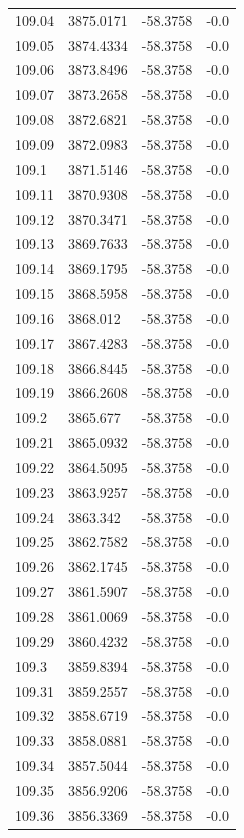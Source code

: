 \begin{table}[H]
\begin{tabular}{llll}
109.04 & 3875.0171 & -58.3758 & -0.0 \\
109.05 & 3874.4334 & -58.3758 & -0.0 \\
109.06 & 3873.8496 & -58.3758 & -0.0 \\
109.07 & 3873.2658 & -58.3758 & -0.0 \\
109.08 & 3872.6821 & -58.3758 & -0.0 \\
109.09 & 3872.0983 & -58.3758 & -0.0 \\
109.1 & 3871.5146 & -58.3758 & -0.0 \\
109.11 & 3870.9308 & -58.3758 & -0.0 \\
109.12 & 3870.3471 & -58.3758 & -0.0 \\
109.13 & 3869.7633 & -58.3758 & -0.0 \\
109.14 & 3869.1795 & -58.3758 & -0.0 \\
109.15 & 3868.5958 & -58.3758 & -0.0 \\
109.16 & 3868.012 & -58.3758 & -0.0 \\
109.17 & 3867.4283 & -58.3758 & -0.0 \\
109.18 & 3866.8445 & -58.3758 & -0.0 \\
109.19 & 3866.2608 & -58.3758 & -0.0 \\
109.2 & 3865.677 & -58.3758 & -0.0 \\
109.21 & 3865.0932 & -58.3758 & -0.0 \\
109.22 & 3864.5095 & -58.3758 & -0.0 \\
109.23 & 3863.9257 & -58.3758 & -0.0 \\
109.24 & 3863.342 & -58.3758 & -0.0 \\
109.25 & 3862.7582 & -58.3758 & -0.0 \\
109.26 & 3862.1745 & -58.3758 & -0.0 \\
109.27 & 3861.5907 & -58.3758 & -0.0 \\
109.28 & 3861.0069 & -58.3758 & -0.0 \\
109.29 & 3860.4232 & -58.3758 & -0.0 \\
109.3 & 3859.8394 & -58.3758 & -0.0 \\
109.31 & 3859.2557 & -58.3758 & -0.0 \\
109.32 & 3858.6719 & -58.3758 & -0.0 \\
109.33 & 3858.0881 & -58.3758 & -0.0 \\
109.34 & 3857.5044 & -58.3758 & -0.0 \\
109.35 & 3856.9206 & -58.3758 & -0.0 \\
109.36 & 3856.3369 & -58.3758 & -0.0 \\

\end{tabular}
\end{table}

